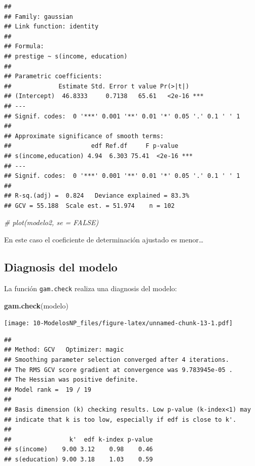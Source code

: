 \documentclass[]{book}
\newenvironment{Shaded}{\begin{snugshade}}{\end{snugshade}}
\newcommand{\KeywordTok}[1]{\textcolor[rgb]{0.13,0.29,0.53}{\textbf{#1}}}
\newcommand{\CommentTok}[1]{\textcolor[rgb]{0.56,0.35,0.01}{\textit{#1}}}
\newcommand{\NormalTok}[1]{#1}
\begin{document}
\begin{verbatim}
## 
## Family: gaussian 
## Link function: identity 
## 
## Formula:
## prestige ~ s(income, education)
## 
## Parametric coefficients:
##             Estimate Std. Error t value Pr(>|t|)    
## (Intercept)  46.8333     0.7138   65.61   <2e-16 ***
## ---
## Signif. codes:  0 '***' 0.001 '**' 0.01 '*' 0.05 '.' 0.1 ' ' 1
## 
## Approximate significance of smooth terms:
##                      edf Ref.df     F p-value    
## s(income,education) 4.94  6.303 75.41  <2e-16 ***
## ---
## Signif. codes:  0 '***' 0.001 '**' 0.01 '*' 0.05 '.' 0.1 ' ' 1
## 
## R-sq.(adj) =  0.824   Deviance explained = 83.3%
## GCV = 55.188  Scale est. = 51.974    n = 102
\end{verbatim}

\begin{Shaded}
\begin{Highlighting}[]
\CommentTok{# plot(modelo2, se = FALSE)}
\end{Highlighting}
\end{Shaded}

En este caso el coeficiente de determinación ajustado es menor\ldots{}

\subsection{Diagnosis del modelo}\label{diagnosis-del-modelo-2}

La función \texttt{gam.check} realiza una diagnosis del modelo:

\begin{Shaded}
\begin{Highlighting}[]
\KeywordTok{gam.check}\NormalTok{(modelo)}
\end{Highlighting}
\end{Shaded}

\texttt{[image: 10-ModelosNP\_files/figure-latex/unnamed-chunk-13-1.pdf]}

\begin{verbatim}
## 
## Method: GCV   Optimizer: magic
## Smoothing parameter selection converged after 4 iterations.
## The RMS GCV score gradient at convergence was 9.783945e-05 .
## The Hessian was positive definite.
## Model rank =  19 / 19 
## 
## Basis dimension (k) checking results. Low p-value (k-index<1) may
## indicate that k is too low, especially if edf is close to k'.
## 
##                k'  edf k-index p-value
## s(income)    9.00 3.12    0.98    0.46
## s(education) 9.00 3.18    1.03    0.59
\end{verbatim}
\end{document}
